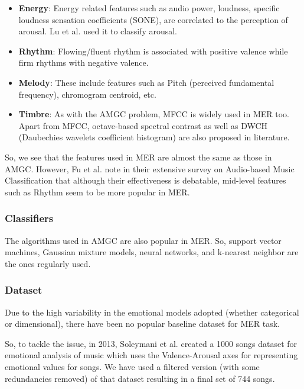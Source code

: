 \begin{itemize}
    \item \textbf{Energy}: Energy related features such as audio power, loudness, specific loudness sensation coefficients (SONE), are correlated to the perception of arousal. 
        Lu et al. \cite{Lu2006} used it to classify arousal.

    \item \textbf{Rhythm}: Flowing/fluent rhythm is associated with positive valence while firm rhythms with negative valence.

    \item \textbf{Melody}: These include features such as Pitch (perceived fundamental frequency), chromogram centroid, etc.

    \item \textbf{Timbre}: As with the AMGC problem, MFCC is widely used in MER too. Apart from MFCC, octave-based spectral contrast as well as DWCH (Daubechies wavelets coefficient histogram) are also proposed in literature.
        
\end{itemize}

So, we see that the features used in MER are almost the same as those in AMGC. However, Fu et al. note in their extensive survey on Audio-based Music Classification \cite{Fu2011} that although their effectiveness is debatable, mid-level features such as Rhythm seem to be more popular in MER.


\subsubsection{Classifiers}

The algorithms used in AMGC are also popular in MER. So, support vector machines, Gaussian mixture models, neural networks, and k-nearest neighbor are the ones regularly used.

\subsubsection{Dataset}

Due to the high variability in the emotional models adopted (whether categorical or dimensional), there have been no popular baseline dataset for MER task.

So, to tackle the issue, in 2013, Soleymani et al. \cite{Soleymani2013} created a 1000 songs dataset for emotional analysis of music which uses the Valence-Arousal axes for representing emotional values for songs.
We have used a filtered version (with some redundancies removed) of that dataset resulting in a final set of 744 songs.

